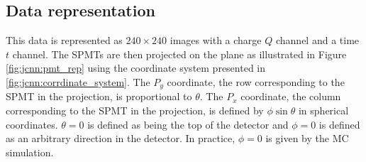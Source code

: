 \documentclass[../main.tex]{subfiles}
\begin{document}
\subsection{Data representation}
\label{sec:jcnn:data}

This data is represented as $240 \times 240$ images with a charge $Q$ channel and a time $t$ channel. The SPMTs are then projected on the plane as illustrated in Figure \ref{fig:jcnn:pmt_rep} using the coordinate system presented in \ref{fig:jcnn:corrdinate_system}. The $P_y$ coordinate, the row corresponding to the SPMT in the projection, is proportional to $\theta$. The $P_x$ coordinate, the column corresponding to the SPMT in the projection, is defined by $\phi \sin{\theta}$ in spherical coordinates. $\theta = 0$ is defined as being the top of the detector and $\phi = 0$ is defined as an arbitrary direction in the detector. In practice, $\phi = 0$ is given by the MC simulation.
\end{document}
